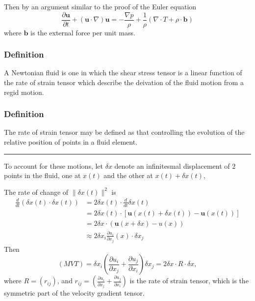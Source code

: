 Then by an argument similar to the proof of the Euler equation
\begin{equation}
\frac{\partial \textbf{u}}{\partial t} + \left(\textbf{u}\cdot \nabla\right)\textbf{u} = -\frac{\nabla p}{\rho} + \frac{1}{\rho}\left(\nabla\cdot T + \rho \cdot \textbf{b}\right)
\end{equation}
where $\textbf{b}$ is the external force per unit mass.

\subsubsection{Definition} %

A Newtonian fluid is one in which the shear stress tensor is a linear function of the rate of strain tensor which describe the deivation of the fluid motion from a regid motion.

\subsubsection{Definition} %

The rate of strain tensor may be defined as that controlling the evolution of the relative position of points in a fluid element.

\vspace{5pt}
\hrule
\vspace{6pt}

To account for these motions, let $\delta x$ denote an infinitesmal displacement of $2$ points in the fluid, one at $x(t)$ and the other at $x(t)+\delta x(t)$, 

The rate of change of $\lVert \delta x(t)\rVert^2$ is 
\begin{equation}
\begin{aligned}
\frac{d}{dt}\left(\delta x(t)\cdot \delta x(t)\right)
&= 2\delta x(t) \cdot \frac{d}{dt}\delta x(t)\\
&= 2\delta x(t) \cdot \left[\textbf{u}(x(t) + \delta x(t)) - \textbf{u}(x(t))\right]\\
&= 2\delta x \cdot \left(\textbf{u}(x+\delta x) - u(x)\right)\\
&\approx 2\delta x_{i} \frac{\partial u_{i}}{\partial x_{j}}(x)\cdot \delta x_{j}
\end{aligned}
\end{equation}
Then
\begin{equation}
(MVT) = \delta x_{i}\left(\frac{\partial u_i}{\partial x_j} + \frac{\partial u_j}{\partial x_i}\right)\delta x_{j} = 2\delta x\cdot R\cdot \delta x,
\end{equation}
where $R = (r_{ij})$, and $\displaystyle r_{ij} = \left(\frac{\partial u_i}{\partial x_j} + \frac{\partial u_j}{\partial x_i}\right)$ is the rate of strain tensor, which is the symmetric part of the velocity gradient tensor.

